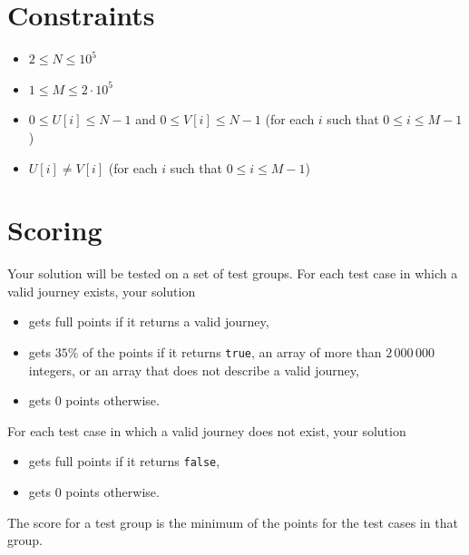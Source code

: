 \section*{Constraints}
\begin{itemize}
  \item $2 \leq N \leq 10^5$
  \item $1 \leq M \leq 2 \cdot 10^5$
  \item $0 \leq U[i] \leq N-1$ and $0 \leq V[i] \leq N-1$ (for each $i$ such that
  $0 \leq i \leq M-1$)
  \item $U[i] \neq V[i]$ (for each $i$ such that $0 \leq i \leq M-1$)
\end{itemize}

\section*{Scoring}
Your solution will be tested on a set of test groups.
For each test case in which a valid journey exists, your solution
\begin{itemize}
  \item gets full points if it returns a valid journey,
  \item gets $35\%$ of the points if it returns \texttt{true}, an array of more than $2\,000\,000$
  integers, or an array that does not describe a valid journey,
  \item gets $0$ points otherwise.
\end{itemize}
For each test case in which a valid journey does not exist, your solution
\begin{itemize}
  \item gets full points if it returns \texttt{false},
  \item gets $0$ points otherwise.
\end{itemize}
The score for a test group is the minimum of the points for the test cases in that group.

